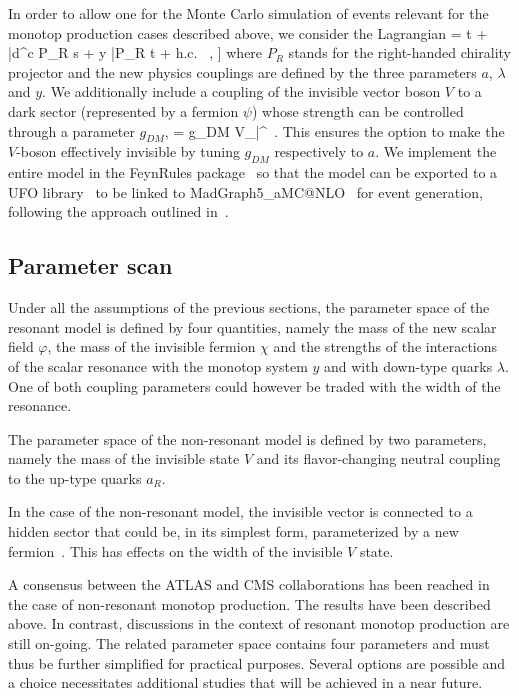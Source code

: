      In order to allow one for the Monte Carlo simulation of events relevant for
     the monotop production cases described above, we consider the Lagrangian
     \be
       \lag =
          t
           + \lambda \varphi \bar d^c P_R s
           + y \varphi \bar \chiDM P_R t
           +  {\rm h.c.} \ ,
         \bigg]
     \ee
     where $P_R$ stands for the right-handed chirality projector and the new
     physics couplings are defined by the three parameters $a$, $\lambda$ and
     $y$. We additionally include a coupling of the invisible vector boson $V$
     to a dark sector (represented by a fermion $\psi$) whose strength can be
     controlled through a parameter $g_{DM}$,
     \be
       \lag = g_{DM} V_\mu \bar\psi \gamma^\mu\psi \ .
     \ee
     This ensures the option to make the $V$-boson effectively invisible by
     tuning $g_{DM}$ respectively to $a$. We implement the entire model in the
     {\sc FeynRules} package~\cite{Alloul:2013bka} so that the model can be
     exported to a UFO library~\cite{Degrande:2011ua} to be linked to
     {\sc MadGraph5\_aMC@NLO}~\cite{Alwall:2014hca} for event generation,
     following the approach outlined in~\cite{Christensen:2009jx}.


\subsection{Parameter scan}

Under all the assumptions of the previous sections, the parameter space of
the resonant model is defined by four quantities, namely the mass of the
new scalar field $\varphi$, the mass of the invisible fermion $\chi$ and
the strengths of the interactions of the scalar resonance with the monotop
system $y$ and with down-type quarks $\lambda$. One of both coupling
parameters could however be traded with the width of the resonance.

The parameter space of the non-resonant model is defined by two
parameters, namely the mass of the invisible state $V$ and its
flavor-changing neutral coupling to the up-type quarks $a_R$.

In the case of the non-resonant model, the invisible vector is connected to
a hidden sector that could be, in its simplest form, parameterized by a new
fermion~\cite{Boucheneb:2014wza}. This has effects on the width of the invisible $V$ state.


A consensus between the ATLAS and CMS collaborations has been reached in
the case of non-resonant monotop production. The results have been
described above. In contrast, discussions in the context of resonant
monotop production are still on-going. The related parameter space
contains four parameters and must thus be further simplified for practical
purposes. Several options are possible and a choice necessitates additional
studies that will be achieved in a near future.



